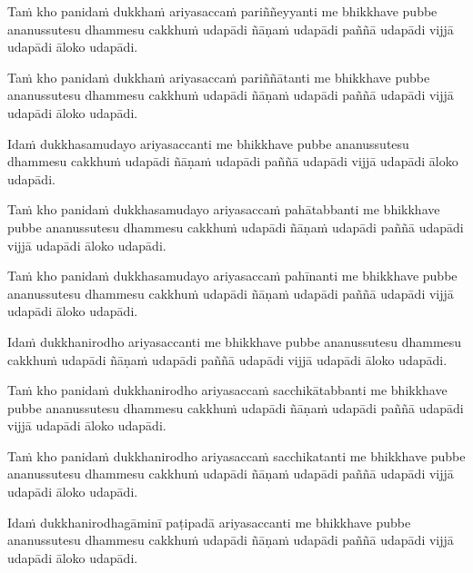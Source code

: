 \begin{pali-hang}
  Taṁ kho panidaṁ dukkhaṁ ariyasaccaṁ pariññeyyanti me bhikkhave pubbe ananussutesu dhammesu cakkhuṁ udapādi ñāṇaṁ udapādi paññā udapādi vijjā udapādi āloko udapādi.
\end{pali-hang}

\begin{pali-hang}
  Taṁ kho panidaṁ dukkhaṁ ariyasaccaṁ pariññātanti me bhikkhave pubbe ananussutesu dhammesu cakkhuṁ udapādi ñāṇaṁ udapādi paññā udapādi vijjā udapādi āloko udapādi.
\end{pali-hang}

\begin{pali-hang}
  Idaṁ dukkhasamudayo ariyasaccanti me bhikkhave pubbe ananussutesu dhammesu cakkhuṁ udapādi ñāṇaṁ udapādi paññā udapādi vijjā udapādi āloko udapādi.
\end{pali-hang}

\begin{pali-hang}
  Taṁ kho panidaṁ dukkhasamudayo ariyasaccaṁ pahātabbanti me bhikkhave pubbe ananussutesu dhammesu cakkhuṁ udapādi ñāṇaṁ udapādi paññā udapādi vijjā udapādi āloko udapādi.
\end{pali-hang}

\begin{pali-hang}
  Taṁ kho panidaṁ dukkhasamudayo ariyasaccaṁ pahīnanti me bhikkhave pubbe ananussutesu dhammesu cakkhuṁ udapādi ñāṇaṁ udapādi paññā udapādi vijjā udapādi āloko udapādi.
\end{pali-hang}

\begin{pali-hang}
  Idaṁ dukkhanirodho ariyasaccanti me bhikkhave pubbe ananussutesu dhammesu cakkhuṁ udapādi ñāṇaṁ udapādi paññā udapādi vijjā udapādi āloko udapādi.
\end{pali-hang}

\begin{pali-hang}
  Taṁ kho panidaṁ dukkhanirodho ariyasaccaṁ sacchikātabbanti me bhikkhave pubbe ananussutesu dhammesu cakkhuṁ udapādi ñāṇaṁ udapādi paññā udapādi vijjā udapādi āloko udapādi.
\end{pali-hang}

\begin{pali-hang}
  Taṁ kho panidaṁ dukkhanirodho ariyasaccaṁ sacchikatanti me bhikkhave pubbe ananussutesu dhammesu cakkhuṁ udapādi ñāṇaṁ udapādi paññā udapādi vijjā udapādi āloko udapādi.
\end{pali-hang}

\begin{pali-hang}
  Idaṁ dukkhanirodhagāminī paṭipadā ariyasaccanti me bhikkhave pubbe ananussutesu dhammesu cakkhuṁ udapādi ñāṇaṁ udapādi paññā udapādi vijjā udapādi āloko udapādi.
\end{pali-hang}

